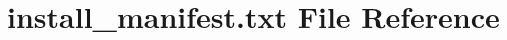 \hypertarget{install__manifest_8txt}{}\section{install\+\_\+manifest.\+txt File Reference}
\label{install__manifest_8txt}
